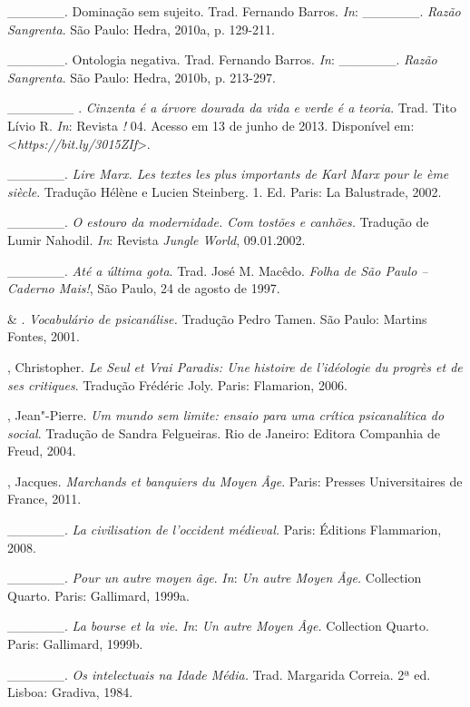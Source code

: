 \begin{Parskip}
\_\_\_\_\_\_. Dominação sem sujeito. Trad. Fernando Barros. \emph{In}:
\_\_\_\_\_\_. \emph{Razão Sangrenta}. São Paulo: Hedra, 2010a, p. 129-211.

\_\_\_\_\_\_. Ontologia negativa. Trad. Fernando Barros. \emph{In}:
\_\_\_\_\_\_. \emph{Razão Sangrenta}. São Paulo: Hedra, 2010b, p. 213-297.

\_\_\_\_\_\_\_ . \emph{Cinzenta é a árvore dourada da vida e verde é a
teoria}. Trad. Tito Lívio R. \emph{In}: Revista \emph{!} 04. Acesso em 13 de
junho de 2013. Disponível em: \textless{}\emph{https://bit.ly/3015ZIf}\textgreater{}.

\_\_\_\_\_\_. \emph{Lire Marx. Les textes les plus importants de Karl
Marx pour le ème siècle}. Tradução Hélène e Lucien Steinberg.
1. Ed. Paris: La Balustrade, 2002.

\_\_\_\_\_\_. \emph{O estouro da modernidade. Com tostões e canhões.}
Tradução de Lumir Nahodil. \emph{In}: Revista \emph{Jungle World}, 09.01.2002.

\_\_\_\_\_\_. \emph{Até a última gota}. Trad. José M. Macêdo.
\emph{Folha de São Paulo -- Caderno Mais!}, São Paulo, 24 de agosto de 1997.

 \& . \emph{Vocabulário de psicanálise.} Tradução
Pedro Tamen. São Paulo: Martins Fontes, 2001.

, Christopher. \emph{Le Seul et Vrai Paradis: Une histoire de
l'idéologie du progrès et de ses critiques}. Tradução Frédéric Joly. Paris: Flamarion, 2006.

, Jean"-Pierre. \emph{Um mundo sem limite: ensaio para uma
crítica psicanalítica do social}. Tradução de Sandra Felgueiras.
Rio de Janeiro: Editora Companhia de Freud, 2004.

, Jacques. \emph{Marchands et banquiers du Moyen Âge}. Paris:
Presses Universitaires de France, 2011.

\_\_\_\_\_\_. \emph{La civilisation de l'occident médieval.} Paris:
Éditions Flammarion, 2008.

\_\_\_\_\_\_. \emph{Pour un autre moyen âge}. \emph{In}: \emph{Un autre Moyen
Âge.} Collection Quarto. Paris: Gallimard, 1999a.

\_\_\_\_\_\_. \emph{La bourse et la vie}. \emph{In}: \emph{Un autre Moyen
Âge.} Collection Quarto. Paris: Gallimard, 1999b.

\_\_\_\_\_\_. \emph{Os intelectuais na Idade Média.} Trad. Margarida Correia. 2ª ed. Lisboa: Gradiva, 1984.


\end{Parskip}
